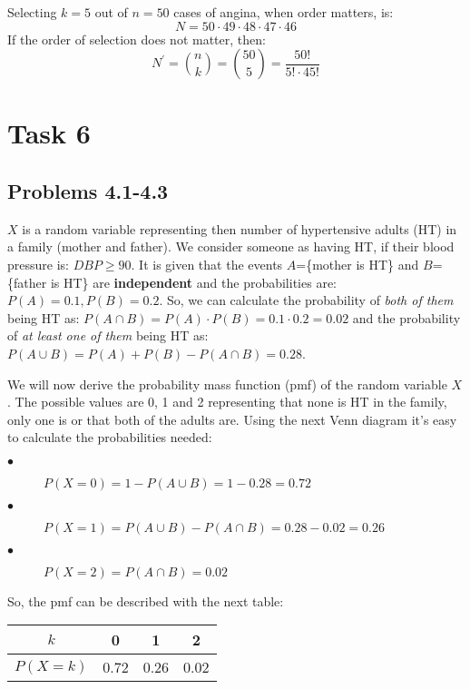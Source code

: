 \documentclass[12pt,a4paper]{article}
\begin{document}
Selecting $k=5$ out of $n=50$ cases of angina, when order matters, is:
$$N=50\cdot49\cdot48\cdot47\cdot46$$
If the order of selection does not matter, then:
$$N^{'}={n \choose k}={50 \choose 5}=\frac{50!}{5!\cdot45!}$$

\section*{Task 6}

\subsection*{Problems 4.1-4.3}

$X$ is a random variable representing then number of hypertensive adults (HT) in a family (mother and father). We consider someone as having HT, if their blood pressure is: $DBP\geq90$. It is given that the events $A$=\{mother is HT\} and $B$=\{father is HT\} are \textbf{independent} and the probabilities are: $P(A)=0.1,P(B)=0.2$. So, we can calculate the probability of \textit{both of them} being HT as: $P(A\cap B)=P(A)\cdot P(B)=0.1\cdot 0.2=0.02$ and the probability of \textit{at least one of them} being HT as: $P(A\cup B)=P(A)+P(B)-P(A\cap B)=0.28$.

We will now derive the probability mass function (pmf) of the random variable $X$. The possible values are 0, 1 and 2 representing that none is HT in the family, only one is or that both of the adults are. Using the next Venn diagram it's easy to calculate the probabilities needed: 
\begin{center}
\end{center}

\begin{description}
  \item[$\bullet$] $P(X=0)=1-P(A\cup B)=1-0.28=0.72$
  \item[$\bullet$] $P(X=1)=P(A\cup B)-P(A\cap B)=0.28-0.02=0.26$
  \item[$\bullet$] $P(X=2)=P(A\cap B)=0.02$
\end{description}

So, the pmf can be described with the next table:

\begin{center}
\begin{tabular}{ c | c | c | c}
 $k$ & 0 & 1 & 2 \\ \hline
 $P(X=k)$ & 0.72 & 0.26 & 0.02
\end{tabular}
\end{center}
\end{document}
